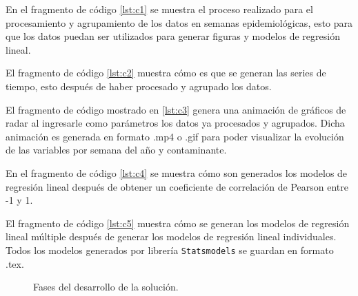 En el fragmento de código \ref{lst:c1} se muestra el proceso realizado para el procesamiento y agrupamiento de los datos en semanas epidemiológicas, esto para que los datos puedan ser utilizados para generar figuras y modelos de regresión lineal.

El fragmento de código \ref{lst:c2} muestra cómo es que se generan las series de tiempo, esto después de haber procesado y agrupado los datos.

El fragmento de código mostrado en \ref{lst:c3} genera una animación de gráficos de radar al ingresarle como parámetros los datos ya procesados y agrupados. Dicha animación es generada en formato .mp4 o .gif para poder visualizar la evolución de las variables por semana del año y contaminante.

En el fragmento de código \ref{lst:c4} se muestra cómo son generados los modelos de regresión lineal después de obtener un coeficiente de correlación de Pearson entre -1 y 1.

El fragmento de código \ref{lst:c5} muestra cómo se generan los modelos de regresión lineal múltiple después de generar los modelos de regresión lineal individuales. Todos los modelos generados por librería \texttt{Statsmodels} se guardan en formato .tex.

\begin{figure}[H]
\caption{Fases del desarrollo de la solución.}
\label{Diagrama de flujo de las fases}
\end{figure}

